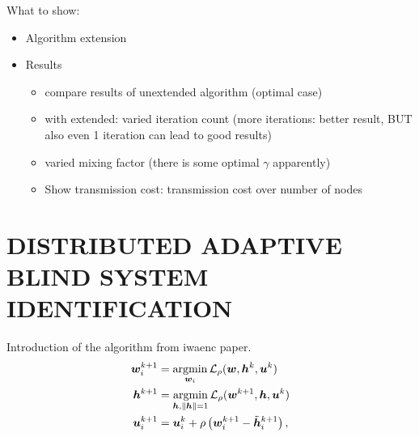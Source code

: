 \documentclass{article}
\begin{document}
What to show:
\begin{itemize}
  \item Algorithm extension
  \item Results
  \begin{itemize}
    \item compare results of unextended algorithm (optimal case)
    \item with extended: varied iteration count (more iterations: better result, BUT also even 1 iteration can lead to good results)
    \item varied mixing factor (there is some optimal \(\gamma\) apparently)
    \item Show transmission cost: transmission cost over number of nodes
  \end{itemize}
\end{itemize}

\section{DISTRIBUTED ADAPTIVE BLIND SYSTEM IDENTIFICATION}
\label{sec:dbsi}
Introduction of the algorithm from iwaenc paper. \cite{blochbergerDBSI}
\begin{align}
  {\bm{w}}_i^{k+1} &= \underset{{\bm{w}}_i}{\operatorname{argmin}} \, \mathcal{L}_{\rho} ({\bm{w}},{\bm{h}}^k,{\bm{u}}^k)\label{eq:general_consensus_admm:local}\\
  {\bm{h}}^{k+1} &= \underset{{\bm{h}}, \|{\bm{h}}\| = 1}{\operatorname{argmin}}\, \mathcal{L}_{\rho} ({\bm{w}}^{k+1},{\bm{h}},{\bm{u}}^k)\label{eq:general_consensus_admm:global}\\
  {\bm{u}}_i^{k+1} &= {\bm{u}}_i^{k} + \rho \left( {\bm{w}}_i^{k+1} - \tilde{{\bm{h}}}_i^{k+1} \right),\label{eq:general_consensus_admm:dual}
\end{align}
\end{document}
